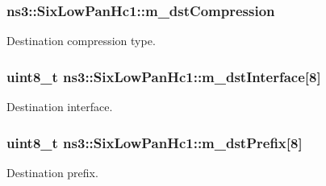 \subsubsection[{\texorpdfstring{m\+\_\+dst\+Compression}{m_dstCompression}}]{ ns3\+::\+Six\+Low\+Pan\+Hc1\+::m\+\_\+dst\+Compression\hspace{0.3cm}{\ttfamily [private]}}\hypertarget{classns3_1_1SixLowPanHc1_a638c930fee35815cfae763b091765bfb}{}\label{classns3_1_1SixLowPanHc1_a638c930fee35815cfae763b091765bfb}


Destination compression type. 

\subsubsection[{\texorpdfstring{m\+\_\+dst\+Interface}{m_dstInterface}}]{\setlength{\rightskip}{0pt plus 5cm}uint8\+\_\+t ns3\+::\+Six\+Low\+Pan\+Hc1\+::m\+\_\+dst\+Interface\mbox{[}8\mbox{]}\hspace{0.3cm}{\ttfamily [private]}}\hypertarget{classns3_1_1SixLowPanHc1_a0a7ab918acbe446789351947e471b2ed}{}\label{classns3_1_1SixLowPanHc1_a0a7ab918acbe446789351947e471b2ed}


Destination interface. 

\subsubsection[{\texorpdfstring{m\+\_\+dst\+Prefix}{m_dstPrefix}}]{\setlength{\rightskip}{0pt plus 5cm}uint8\+\_\+t ns3\+::\+Six\+Low\+Pan\+Hc1\+::m\+\_\+dst\+Prefix\mbox{[}8\mbox{]}\hspace{0.3cm}{\ttfamily [private]}}\hypertarget{classns3_1_1SixLowPanHc1_a2c5f175690fd1e3269f98a9e0ed7b845}{}\label{classns3_1_1SixLowPanHc1_a2c5f175690fd1e3269f98a9e0ed7b845}


Destination prefix. 

